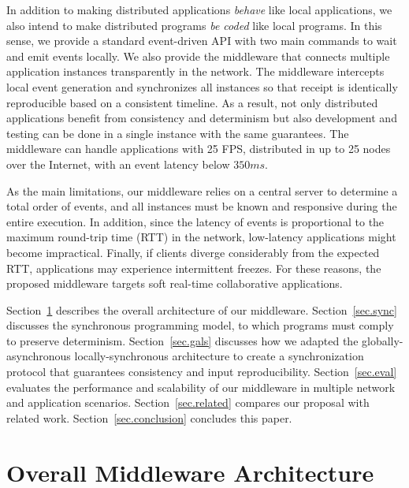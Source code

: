 \documentclass[sigplan,screen]{acmart}
\begin{document}
In addition to making distributed applications \emph{behave} like local
applications, we also intend to make distributed programs \emph{be coded} like
local programs.
In this sense, we provide a standard event-driven API with two main commands
to wait and emit events locally.
We also provide the middleware that connects multiple application instances
transparently in the network.
The middleware intercepts local event generation and synchronizes all instances
so that receipt is identically reproducible based on a consistent timeline.
As a result, not only distributed applications benefit from consistency and
determinism but also development and testing can be done in a single instance
with the same guarantees.
The middleware can handle applications with 25 FPS, distributed in up to 25
nodes over the Internet, with an event latency below $350ms$.

As the main limitations, our middleware relies on a central server to determine
a total order of events, and all instances must be known and responsive during
the entire execution.
In addition, since the latency of events is proportional to the maximum
round-trip time (RTT) in the network, low-latency applications might become
impractical.
Finally, if clients diverge considerably from the expected RTT, applications
may experience intermittent freezes.
For these reasons, the proposed middleware targets soft real-time collaborative
applications.

Section~\ref{sec.arch} describes the overall architecture of our middleware.
Section~\ref{sec.sync} discusses the synchronous programming model, to which
programs must comply to preserve determinism.
Section~\ref{sec.gals} discusses how we adapted the globally-asynchronous
locally-synchronous architecture to create a synchronization protocol that
guarantees consistency and input reproducibility.
Section~\ref{sec.eval} evaluates the performance and scalability of our
middleware in multiple network and application scenarios.
Section~\ref{sec.related} compares our proposal with related work.
Section~\ref{sec.conclusion} concludes this paper.

\section{Overall Middleware Architecture}
\label{sec.arch}
\end{document}
